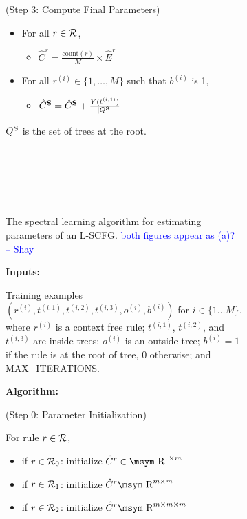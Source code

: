 \documentclass[11pt]{article}
\newcommand{\rione}{r^{(i)}}
\newcommand{\xione}{t^{(i,1)}}
\newcommand{\xitwo}{t^{(i,2)}}
\newcommand{\xithree}{t^{(i,3)}}
\newcommand{\oi}{o^{(i)}}
\newcommand{\rules}{{\cal R}}
\newcommand{\srule}{{X \rightarrow b, c}}
\newcommand{\e}[1]{\hat{#1}}
\newcommand{\bS}{{\bf S}}
\newcommand{\reals}{\mbox{\msym R}}
\newcommand{\shaycomment}[1]{\textcolor{blue}{#1 -- Shay}}
\begin{document}
\begin{figure*}[t!]
{\begin{footnotesize}
\begin{subfigure}{0.87\columnwidth}
	(Step 3: Compute Final Parameters)
	\begin{itemize}
		\item For all $r \in \rules$, 
			\begin{itemize}[label={}]
				\item $\e{C}^r = \frac{\textrm{count}(r)}{M} \times \e{E}^r$
			\end{itemize}
		\item For all $\rione \in \{1, \dots, M\}$ such that $b^{(i)}$ is 1, 
		\begin{itemize}[label={}]
			\item $\e{C}^\bS =  \e{C}^\bS + \frac{Y(\xione)}{|Q^\bS|} $
		\end{itemize}						
	\end{itemize}
	$Q^\bS$ is the set of trees at the root.  

$\,$

$\,$

$\,$

$\,$

$\,$

$\,$

$\,$

	\caption{\small The spectral learning algorithm for estimating parameters of an L-SCFG. \shaycomment{both figures appear as (a)?}}
	\label{fig:splearn}
	\end{subfigure}
	\begin{subfigure}{1.05\columnwidth}
	{\bf Inputs:} 
	
	Training examples $(\rione, \xione, \xitwo, \xithree, \oi, b^{(i)})$ for $i \in \{1 \ldots M\}$, where $\rione$ is a context free rule; $\xione$, $\xitwo$, and $\xithree$ are inside trees; $\oi$ is an outside tree; $b^{(i)} = 1$ if the rule is at the root of tree, $0$ otherwise; and MAX\_ITERATIONS.

	{\bf Algorithm:}

	(Step 0: Parameter Initialization)
	
	For rule $r \in \rules$,
	\begin{itemize}[noitemsep]
		\item if $r \in \rules_0$: initialize $\e{C}^r \in \reals^{1 \times m}$ 
		\item if $r \in \rules_1$: initialize $\e{C}^r \reals^{m \times m}$ 
		\item if $r \in \rules_2$: initialize $\e{C}^r \reals^{m \times m \times m}$ 
	\end{itemize}
	

\end{subfigure}
\end{footnotesize}}
\end{figure*}
\end{document}
